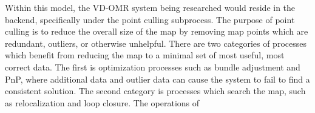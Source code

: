 Within this model, the VD-OMR system being researched would reside in the backend, specifically under the point culling subprocess. The purpose of point culling is to reduce the overall size of the map by removing map points which are redundant, outliers, or otherwise unhelpful. There are two categories of processes which benefit from reducing the map to a minimal set of most useful, most correct data. The first is optimization processes such as bundle adjustment and PnP, where additional data and outlier data can cause the system to fail to find a consistent solution. The second category is processes which search the map, such as relocalization and loop closure. The operations of
